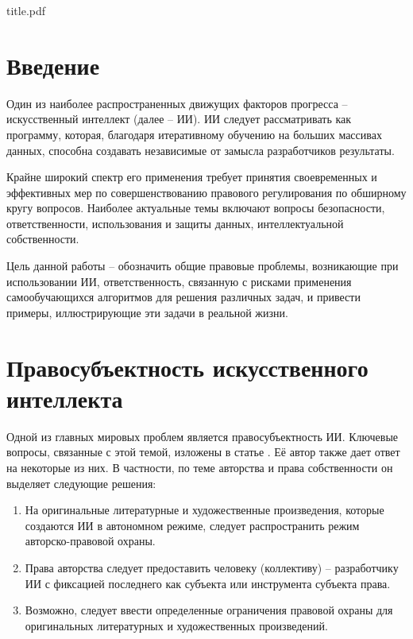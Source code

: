 

\def\oldbibitem{}
\let\oldbibitem=\bibitem
\def\bibitem{\stepcounter{citenum}\oldbibitem}



{title.pdf}

\tableofcontents
\newpage

\section{Введение}
Один из наиболее распространенных движущих факторов прогресса – искусственный
интеллект (далее – ИИ). ИИ следует рассматривать как программу, которая, благодаря
итеративному обучению на больших массивах данных, способна создавать независимые от
замысла разработчиков результаты.

Крайне широкий спектр его применения требует принятия
своевременных и эффективных мер по совершенствованию правового регулирования по
обширному кругу вопросов. Наиболее актуальные темы включают вопросы безопасности,
ответственности, использования и защиты данных, интеллектуальной собственности.

Цель данной работы -- обозначить общие правовые проблемы, возникающие при использовании ИИ,
ответственность, связанную с рисками применения самообучающихся алгоритмов для
решения различных задач, и привести примеры, иллюстрирующие эти задачи в реальной жизни.

\newpage
\section{Правосубъектность искусственного интеллекта}
Одной из главных мировых проблем является правосубъектность ИИ. Ключевые вопросы, связанные
с этой темой, изложены в статье \cite{II}. Её автор также дает ответ на некоторые из них.
В частности, по теме авторства и права собственности он выделяет следующие решения:

\begin{enumerate}
\item На оригинальные литературные и художественные произведения, которые создаются ИИ в автономном режиме,
следует распространить режим авторско-правовой охраны.
\item Права авторства следует предоставить человеку (коллективу) – разработчику ИИ с фиксацией последнего как
субъекта или инструмента субъекта права.
\item Возможно, следует ввести определенные ограничения правовой охраны для оригинальных литературных и
художественных произведений.
\end{enumerate}

